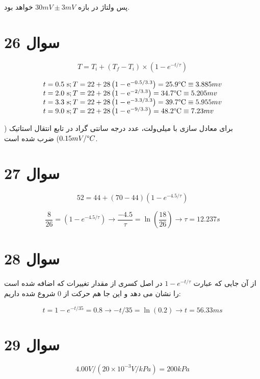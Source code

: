 \documentclass[12pt]{article}
\begin{document}
پس ولتاژ در بازه
 $30 mV \pm 3 mV$
  خواهد بود.




\section*{سوال 26}
$$T = T_i + (T_f - T_i) \times (1 - e^{-t / \tau})$$

$$
\begin{array}{l}
	t=0.5 \mathrm{~s} ; T=22+28\left(1-\mathrm{e}^{-0.5 / 3.3}\right)=25.9 \degree \mathrm{C} \equiv 3.885 mv \\
	t=2.0 \mathrm{~s} ; T=22+28\left(1-\mathrm{e}^{-2 / 3.3}\right)=34.7 \degree \mathrm{C} \equiv 5.205 mv \\
	t=3.3 \mathrm{~s} ; T=22+28\left(1-\mathrm{e}^{-3.3 / 3.3}\right)=39.7 \degree \mathrm{C} \equiv 5.955 mv \\
	t=9.0 \mathrm{~s} ; T=22+28\left(1-\mathrm{e}^{-9 / 3.3}\right)=48.2 \degree \mathrm{C} \equiv 7.23 mv
\end{array}
$$

برای معادل سازی با میلی‌ولت، عدد درجه سانتی گراد در تابع انتقال استاتیک ($0.15 mV / \degree C$) ضرب شده است.


\section*{سوال 27}

$$52 = 44 + (70 - 44)(1 - e^{- 4.5 / \tau}) $$

$$\frac{8}{26} =(1 - e^{- 4.5 / \tau}) \rightarrow \frac{-4.5}{\tau}= \ln (\frac{18}{26}) \rightarrow \tau = 12.237 s $$

\section*{سوال 28}

از آن جایی که عبارت
$1 - e^{-t / \tau}$
در اصل کسری از مقدار تغییرات که اضافه شده است را نشان می دهد و این جا هم حرکت از $0$ شروع شده داریم:

$$t= 1 - e^{-t / 35} = 0.8 \rightarrow -t/35 = \ln (0.2) \rightarrow t = 56.33 ms$$



\section*{سوال 29}

$$4.00 V / (20  \times 10^{-3} V/kPa) = 200 kPa$$
\end{document}
